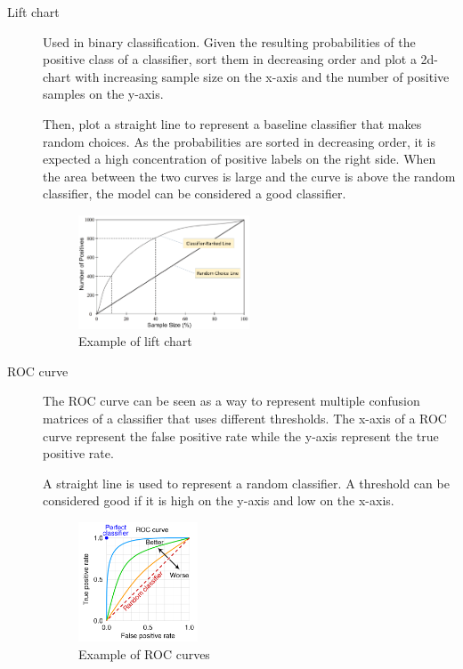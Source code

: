 \begin{description}
    \item[Lift chart] 
        Used in binary classification.
        Given the resulting probabilities of the positive class of a classifier, 
        sort them in decreasing order and plot a 2d-chart with
        increasing sample size on the x-axis and the number of positive samples on the y-axis.

        Then, plot a straight line to represent a baseline classifier that makes random choices.
        As the probabilities are sorted in decreasing order, it is expected a high concentration of
        positive labels on the right side.
        When the area between the two curves is large and the curve is above the random classifier, 
        the model can be considered a good classifier.

        \begin{figure}[h]
            \centering
            \includegraphics[width=0.5\textwidth]{img/lift_chart.png}
            \caption{Example of lift chart}
        \end{figure}

    \item[ROC curve] 
        The ROC curve can be seen as a way to represent multiple confusion matrices of a classifier
        that uses different thresholds.
        The x-axis of a ROC curve represent the false positive rate while the y-axis represent the true positive rate.

        A straight line is used to represent a random classifier.
        A threshold can be considered good if it is high on the y-axis and low on the x-axis.
        
        \begin{figure}[h]
            \centering
            \includegraphics[width=0.35\textwidth]{img/roc_curve.png}
            \caption{Example of ROC curves}
        \end{figure}
\end{description}



